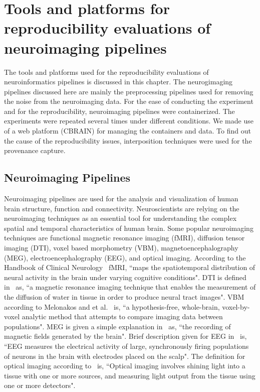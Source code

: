 \chapter{Tools and platforms for reproducibility evaluations of neuroimaging pipelines}\label{toolsandplatforms}

The tools and platforms used for the reproducibility evaluations of neuroinformatics pipelines is discussed in this chapter. The neurogimaging pipelines discussed here are mainly the preprocessing pipelines used for removing the noise from the neuroimaging data. For the ease of conducting the experiment and for the reproducibility, neuroimaging pipelines were containerized. The experiments were repeated several times under different conditions. We made use of a web platform (CBRAIN) for managing the containers and data. To find out the cause of the reproducibility issues, interposition techniques were used for the provenance capture.

\section{Neuroimaging Pipelines}\label{neuroimaging}
Neuroimaging pipelines are used for the analysis and visualization of human brain structure, function and connectivity. Neuroscientists are relying on the neuroimaging techniques as an essential tool for understanding the complex spatial and temporal characteristics of human brain. Some popular neuroimaging techniques are functional magnetic resonance imaging (fMRI), diffusion tensor imaging (DTI), voxel based morphometry (VBM), magnetoencephalography (MEG), electroencephalography (EEG), and optical imaging. According  to the Handbook of Clinical Neurology~\cite{BUCHBINDER201661} fMRI, ``maps the spatiotemporal distribution of neural activity in the brain under varying cognitive conditions". DTI is defined in~\cite{Rizea11} as, ``a magnetic resonance imaging technique that enables the measurement of the diffusion of water in tissue in order to produce neural tract images". VBM according to Melonakos and et al.~\cite{MELONAKOS201165} is, ``a hypothesis-free, whole-brain, voxel-by-voxel analytic method that attempts to compare imaging data between populations". MEG is given a simple explanation in~\cite{Sato1985} as, ``the recording of magnetic fields generated by the brain". Brief description given for EEG in~\cite{Light2010} is, ``EEG measures the electrical activity of large, synchronously firing populations of neurons in the brain with electrodes placed on the scalp". The definition for optical imaging according to~\cite{doi:10.1080/23273798.2017.1290810} is, ``Optical imaging involves shining light into a tissue with one or more sources, and measuring light output from the tissue using one or more detectors".

